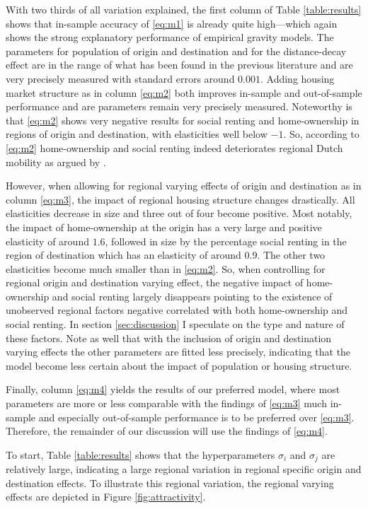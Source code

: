 \documentclass[11pt,parskip,abstracton,notitlepage, dvipsnames]{scrartcl}
\begin{document}
With two thirds of all variation explained, the first column of Table \ref{table:results} shows that in-sample accuracy of \ref{eq:m1} is already quite high---which again shows the strong explanatory performance of empirical gravity models. The parameters for population of origin and destination and for the distance-decay effect are in the range of what has been found in the previous literature and are very precisely measured with standard errors around $0.001$. Adding housing market structure as in column \ref{eq:m2} both improves in-sample and out-of-sample performance and are parameters remain very precisely measured. Noteworthy is that \ref{eq:m2} shows very negative results for social renting and home-ownership in regions of origin and destination, with elasticities well below $-1$. So, according to \ref{eq:m2} home-ownership and social renting indeed deteriorates  regional Dutch mobility as argued by \citet{oswald1996conjecture, oswald1999housing}. 

However, when allowing for regional varying effects of origin and destination as in column \ref{eq:m3}, the impact of regional housing structure changes drastically. All elasticities decrease in size and three out of four become positive. Most notably, the impact of home-ownership at the origin has a very large and positive elasticity of around $1.6$, followed in size by the percentage social renting in the region of destination which has an elasticity of around $0.9$. The other two elasticities become much smaller than in \ref{eq:m2}. So, when controlling for regional origin and destination varying effect, the negative impact of home-ownership and social renting largely disappears pointing to the existence of unobserved regional factors negative correlated with both home-ownership and social renting. In section \ref{sec:discussion} I speculate on the type and nature of these factors. Note as well that with the inclusion of origin and destination varying effects the other parameters are fitted less precisely, indicating that the model become less certain about the impact of population or housing structure.

Finally, column \ref{eq:m4} yields the results of our preferred model, where most parameters are more or less comparable with the findings of \ref{eq:m3} much in-sample and especially out-of-sample performance is to be preferred over \ref{eq:m3}. Therefore, the remainder of our discussion will use the findings of \ref{eq:m4}. 

To start, Table \ref{table:results} shows that the hyperparameters $\sigma_i$ and $\sigma_j$ are relatively large, indicating a large regional variation in regional specific origin and destination effects. To illustrate this regional variation, the regional varying effects are depicted in Figure \ref{fig:attractivity}. 
\end{document}

